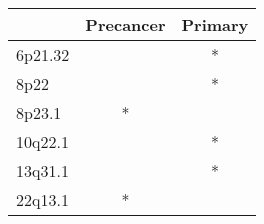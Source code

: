 \begin{tabular}{lcc}
\toprule
{} & Precancer & Primary \\
\midrule
6p21.32 &           &       * \\
8p22    &           &       * \\
8p23.1  &         * &         \\
10q22.1 &           &       * \\
13q31.1 &           &       * \\
22q13.1 &         * &         \\
\bottomrule
\end{tabular}
